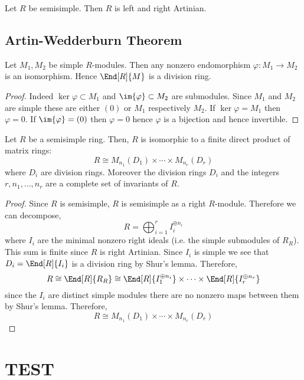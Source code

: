 \documentclass[12pt]{article}
\begin{document}
\begin{prop}
Let $R$ be semisimple. Then $R$ is left and right Artinian. 
\end{prop}


\subsection{Artin-Wedderburn Theorem}

\begin{lemma}[Shur]
Let $M_1, M_2$ be simple $R$-modules. Then any nonzero endomorphism $\varphi : M_1 \to M_2$ is an isomorphism. Hence $\End[R]{M}$ is a division ring.
\end{lemma}

\begin{proof}
Indeed $\ker{\varphi} \subset M_1$ and $\im{\varphi} \subset M_2$ are submodules. Since $M_1$ and $M_2$ are simple these are either $(0)$ or $M_1$ respectively $M_2$. If $\ker{\varphi} = M_1$ then $\varphi = 0$. If $\im{\varphi} = (0)$ then $\varphi = 0$ hence $\varphi$ is a bijection and hence invertible.
\end{proof}


\begin{theorem}
Let $R$ be a semisimple ring. Then, $R$ is isomorphic to a finite direct product of matrix rings:
\[ R \cong M_{n_1}(D_1) \times \cdots \times M_{n_r}(D_r) \]
where $D_i$ are division rings. Moreover the division rings $D_i$ and the integers $r, n_1, \dots, n_r$ are a complete set of invariants of $R$.
\end{theorem}

\begin{proof}
Since $R$ is semisimple, $R$ is semisimple as a right $R$-module. Therefore we can decompose,
\[ R = \bigoplus_{i = 1}^r I_i^{\oplus n_i} \]
where $I_i$ are the minimal nonzero right ideals (i.e. the simple submodules of $R_R$). This sum is finite since $R$ is right Artinian. Since $I_i$ is simple we see that $D_i = \End[R]{I_i}$ is a division ring by Shur's lemma. Therefore,
\[ R \cong \End[R]{R_R} \cong \End[R]{I_1^{\oplus n_i}} \times \cdots \times \End[R]{I_r^{\oplus n_r}} \]
since the $I_i$ are distinct simple modules there are no nonzero maps between them by Shur's lemma. Therefore,
\[ R \cong M_{n_1}(D_1) \times \cdots \times M_{n_r}(D_r) \]
\end{proof}

\section{TEST}
\end{document}
